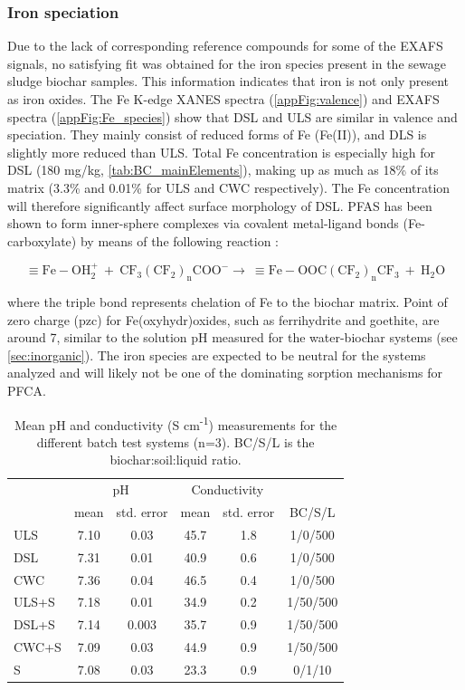 \subsubsection{Iron speciation}
Due to the lack of corresponding reference compounds for some of the EXAFS signals, no satisfying fit was obtained for the iron species present in the sewage sludge biochar samples. This information indicates that iron is not only present as iron oxides. The Fe K-edge XANES spectra (\cref{appFig:valence}) and EXAFS spectra (\cref{appFig:Fe_species}) show that DSL and ULS are similar in valence and speciation. They mainly consist of reduced forms of Fe (Fe(II)), and DLS is slightly more reduced than ULS. Total Fe concentration is especially high for DSL (180 mg/kg, \cref{tab:BC_mainElements}), making up as much as 18\% of its matrix (3.3\% and 0.01\% for ULS and CWC respectively). The Fe concentration will therefore significantly affect surface morphology of DSL. PFAS has been shown to form inner-sphere complexes via covalent metal-ligand bonds (Fe-carboxylate) by means of the following reaction \citep{du2014adsorption}:

\begin{equation}
    \mathrm{\equiv Fe-OH_2^+ ~ + ~ CF_3(CF_2)_nCOO^- \rightarrow ~ \equiv Fe-OOC(CF_2)_nCF_3 ~+~ H_2O}
\end{equation}

where the triple bond represents chelation of Fe to the biochar matrix. Point of zero charge (pzc) for Fe(oxyhydr)oxides, such as ferrihydrite and goethite, are around 7, similar to the solution pH measured for the water-biochar systems (see \cref{sec:inorganic}). The iron species are expected to be neutral for the systems analyzed and will likely not be one of the dominating sorption mechanisms for PFCA. 

\begin{table}
\centering
\caption{Mean pH and conductivity (\textmu S cm\textsuperscript{-1}) measurements for the different batch test systems (n=3). BC/S/L is the biochar:soil:liquid ratio.}
\label{tab:pHcond}
\begin{tabular}{lccccc}
\toprule
 & \multicolumn{2}{c}{pH} & \multicolumn{2}{c}{Conductivity} & \\ \cmidrule(l){2-3} \cmidrule(l){4-5}
 & mean & std. error & mean & std. error & BC/S/L\\ 
\midrule
ULS & 7.10 & 0.03 & 45.7 & 1.8 & 1/0/500\\
DSL & 7.31 & 0.01 & 40.9 & 0.6 & 1/0/500\\
CWC & 7.36 & 0.04 & 46.5 & 0.4 & 1/0/500\\
ULS+S & 7.18 & 0.01 & 34.9 & 0.2 & 1/50/500\\
DSL+S & 7.14 & 0.003 & 35.7 & 0.9 & 1/50/500\\
CWC+S & 7.09 & 0.03 & 44.9 & 0.9 & 1/50/500\\
S & 7.08 & 0.03 & 23.3 & 0.9 & 0/1/10\\
\bottomrule
\end{tabular}
\end{table}

